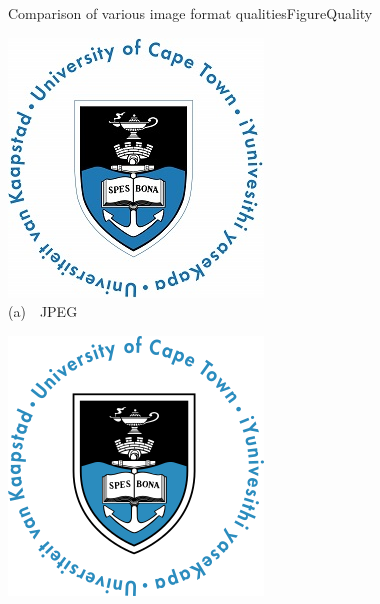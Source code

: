 \begin{FigureEnvironment}{Comparison of various image format qualities}{FigureQuality}%
  \hfill
  \begin{minipage}[b]{0.3\textwidth}\centering\setlength{\parindent}{0mm}
    \includegraphics[width=\textwidth]{../Figures/UCT.jpg}\\%
    {\small (a)~~JPEG}%
  \end{minipage}
  \hfill
  \begin{minipage}[b]{0.3\textwidth}\centering\setlength{\parindent}{0mm}
    \includegraphics[width=\textwidth]{../Figures/UCT.png}\\%

\end{minipage}
\end{FigureEnvironment}
